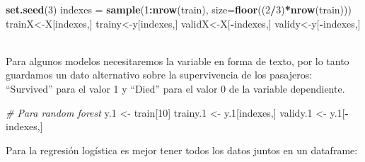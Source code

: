 \documentclass[
]{article}
\newenvironment{Shaded}{\begin{snugshade}}{\end{snugshade}}
\newcommand{\CommentTok}[1]{\textcolor[rgb]{0.56,0.35,0.01}{\textit{#1}}}
\newcommand{\DataTypeTok}[1]{\textcolor[rgb]{0.13,0.29,0.53}{#1}}
\newcommand{\DecValTok}[1]{\textcolor[rgb]{0.00,0.00,0.81}{#1}}
\newcommand{\FloatTok}[1]{\textcolor[rgb]{0.00,0.00,0.81}{#1}}
\newcommand{\KeywordTok}[1]{\textcolor[rgb]{0.13,0.29,0.53}{\textbf{#1}}}
\newcommand{\NormalTok}[1]{#1}
\newcommand{\OperatorTok}[1]{\textcolor[rgb]{0.81,0.36,0.00}{\textbf{#1}}}
\newcommand{\StringTok}[1]{\textcolor[rgb]{0.31,0.60,0.02}{#1}}
\begin{document}
\texttt{}

\begin{Shaded}
\begin{Highlighting}[]
\KeywordTok{set.seed}\NormalTok{(}\DecValTok{3}\NormalTok{)}
\NormalTok{indexes =}\StringTok{ }\KeywordTok{sample}\NormalTok{(}\DecValTok{1}\OperatorTok{:}\KeywordTok{nrow}\NormalTok{(train), }\DataTypeTok{size=}\KeywordTok{floor}\NormalTok{((}\DecValTok{2}\OperatorTok{/}\DecValTok{3}\NormalTok{)}\OperatorTok{*}\KeywordTok{nrow}\NormalTok{(train)))}
\NormalTok{trainX<-X[indexes,]}
\NormalTok{trainy<-y[indexes,]}
\NormalTok{validX<-X[}\OperatorTok{-}\NormalTok{indexes,]}
\NormalTok{validy<-y[}\OperatorTok{-}\NormalTok{indexes,]}
\end{Highlighting}
\end{Shaded}

\texttt{}\\
Para algunos modelos necesitaremos la variable en forma de texto, por lo
tanto guardamos un dato alternativo sobre la supervivencia de los
pasajeros: ``Survived'' para el valor 1 y ``Died'' para el valor 0 de la
variable dependiente.\\
\texttt{}

\begin{Shaded}
\end{Shaded}

\texttt{}

\begin{Shaded}
\begin{Highlighting}[]
\CommentTok{# Para random forest}
\NormalTok{y}\FloatTok{.1}\NormalTok{ <-}\StringTok{ }\NormalTok{train[}\DecValTok{10}\NormalTok{]}
\NormalTok{trainy}\FloatTok{.1}\NormalTok{ <-}\StringTok{ }\NormalTok{y}\FloatTok{.1}\NormalTok{[indexes,]}
\NormalTok{validy}\FloatTok{.1}\NormalTok{ <-}\StringTok{ }\NormalTok{y}\FloatTok{.1}\NormalTok{[}\OperatorTok{-}\NormalTok{indexes,]}
\end{Highlighting}
\end{Shaded}

\texttt{}

Para la regresión logística es mejor tener todos los datos juntos en un
dataframe:
\end{document}
